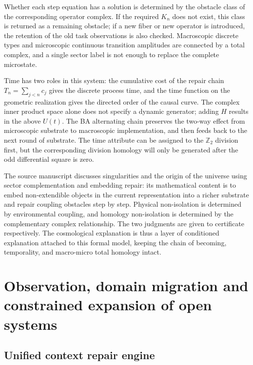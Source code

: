 \documentclass[11pt,a4paper]{article}
\theoremstyle{plain}
\theoremstyle{definition}
\theoremstyle{remark}
\begin{document}
\begin{CJK*}
Whether each step equation has a solution is determined by the obstacle class of the corresponding operator complex. If the required $K_n$ does not exist, this class is returned as a remaining obstacle; if a new fiber or new operator is introduced, the retention of the old task observations is also checked. Macroscopic discrete types and microscopic continuous transition amplitudes are connected by a total complex, and a single sector label is not enough to replace the complete microstate.

Time has two roles in this system: the cumulative cost of the repair chain $T_n=\sum_{j<n}c_j$ gives the discrete process time, and the time function on the geometric realization gives the directed order of the causal curve. The complex inner product space alone does not specify a dynamic generator; adding $H$ results in the above $U(t)$. The BA alternating chain preserves the two-way effect from microscopic substrate to macroscopic implementation, and then feeds back to the next round of substrate. The time attribute can be assigned to the $\mathbb Z_2$ division first, but the corresponding division homology will only be generated after the odd differential square is zero.

The source manuscript discusses singularities and the origin of the universe using sector complementation and embedding repair: its mathematical content is to embed non-extendible objects in the current representation into a richer substrate and repair coupling obstacles step by step. Physical non-isolation is determined by environmental coupling, and homology non-isolation is determined by the complementary complex relationship. The two judgments are given to certificate respectively. The cosmological explanation is thus a layer of conditioned explanation attached to this formal model, keeping the chain of becoming, temporality, and macro-micro total homology intact.

\section { Observation, domain migration and constrained expansion of open systems }\label{ss:open}


\subsection { Unified context repair engine }


\end{CJK*}
\end{document}

